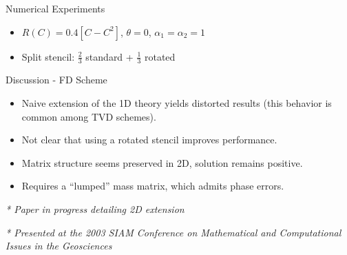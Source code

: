 \documentclass[landscape,pdftex,headrule,footrule]{foils}
\begin{document}
\begin{foil}{Numerical Experiments}
{{\begin{minipage}[h]{.5\textwidth}
\begin{figure}[h]
\begin{center}
	  \end{center}
	\end{figure}
      \end{minipage}
      
      \vspace{.2in}
      \begin{itemize}
	\tightlist
        \item $R(C) = 0.4\left[C - C^2\right]$, $\theta = 0$, $\alpha_1 = \alpha_2 = 1$
	\item Split stencil: $\frac{2}{3}$ standard + $\frac{1}{3}$ rotated
      \end{itemize}
    }
  }
\end{foil}
                                                                                
                                                                                
                                                                                
                                                                                
\begin{foil}{Discussion - FD Scheme}
  \begin{itemize}
    \item Naive extension of the 1D theory yields distorted results
          (this behavior is common among TVD schemes).
    \item Not clear that using a rotated stencil improves performance.
    \item Matrix structure seems preserved in 2D, solution remains positive.
    \item Requires a ``lumped'' mass matrix, which admits phase errors.
  \end{itemize}
  \vspace{.25in}
  \emph{* Paper in progress detailing 2D extension}
  
  \emph{* Presented at the 2003  SIAM Conference on Mathematical and Computational Issues in the Geosciences}
\end{foil}
                                                                                
                                                                                
                                                                                
\end{document}
